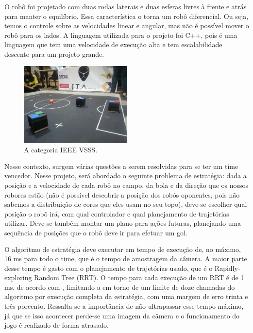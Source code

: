 \documentclass[a4paper,12pt]{article}
\begin{document}
O robô foi projetado com duas rodas laterais e duas esferas livres à frente e atrás para manter o equilíbrio. Essa característica o torna um robô diferencial. Ou seja, temos o controle sobre as velocidades linear e angular, mas não é possível mover o robô para os lados. A linguagem utilizada para o projeto foi C++, pois é uma linguagem que tem uma velocidade de execução alta e tem escalabilidade descente para um projeto grande.

\begin{figure}[H]
	\label{fig: vss}
	\centering
	\includegraphics[width=0.5\textwidth]{figures/vss.JPG}
   \caption{A categoria IEEE VSSS.}
\end{figure}

Nesse contexto, surgem várias questões a serem resolvidas para se ter um time vencedor. Nesse projeto, será abordado o seguinte problema de estratégia: dada a posição e a velocidade de cada robô no campo, da bola e da direção que os nossos robores estão (não é possível descobrir a posição dos robôs oponentes, pois não sabemos a distribuição de cores que eles usam no seu topo), deve-se escolher qual posição o robô irá, com qual controlador  e qual planejamento de trajetórias utilizar. Deve-se também montar um plano para ações futuras, planejando uma sequência de posições que o robô deve ir para efetuar um gol.

O algoritmo de estratégia deve executar em tempo de execução de, no máximo, 16 ms para todo o time, que é o tempo de amostragem da câmera. A maior parte desse tempo é gasto com o planejamento de trajetórias usado, que é o Rapidly-exploring Random Tree (RRT). O tempo para cada execução de um RRT é de 1 ms, de acordo com \cite{franzoni_rrt}, limitando a em torno de um limite de doze chamadas do algoritmo por execução completa da estratégia, com uma margem de erro trinta e três porcento. Ressalta-se a importância de não ultrapassar esse tempo máximo, já que se isso acontecer perde-se uma imagem da câmera e o funcionamento do jogo é realizado de forma atrasado.
\end{document}
